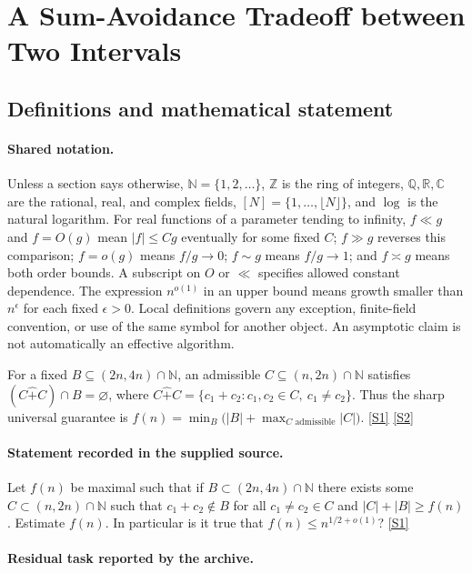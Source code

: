 \documentclass[11pt,a4paper]{article}
\newcommand{\N}{\mathbb{N}}
\newcommand{\Z}{\mathbb{Z}}
\newcommand{\Q}{\mathbb{Q}}
\newcommand{\R}{\mathbb{R}}
\newcommand{\C}{\mathbb{C}}
\newcommand{\sref}[2]{\hyperlink{source:#1:#2}{[S#2]}}
\begin{document}
\section{A Sum-Avoidance Tradeoff between Two Intervals}\label{statement}


\subsection{Definitions and mathematical statement}

\paragraph{Shared notation.}Unless a section says otherwise, $\N=\{1,2,\ldots\}$,
$\Z$ is the ring of integers, $\Q,\R,\C$ are the rational, real, and complex
fields, $[N]=\{1,\ldots,\lfloor N\rfloor\}$, and $\log$ is the natural
logarithm. For real functions of a parameter tending to infinity,
$f\ll g$ and $f=O(g)$ mean $|f|\leq Cg$ eventually for some fixed $C$;
$f\gg g$ reverses this comparison; $f=o(g)$ means $f/g\to0$;
$f\sim g$ means $f/g\to1$; and $f\asymp g$ means both order bounds.
A subscript on $O$ or $\ll$ specifies allowed constant dependence.
The expression $n^{o(1)}$ in an upper bound means growth smaller than
$n^\epsilon$ for each fixed $\epsilon>0$. Local definitions govern any
exception, finite-field convention, or use of the same symbol for another
object. An asymptotic claim is not automatically an effective algorithm.



For a fixed $B\subseteq(2n,4n)\cap\N$, an admissible $C\subseteq(n,2n)\cap\N$ satisfies $(C\mathbin{\hat+}C)\cap B=\varnothing$, where $C\mathbin{\hat+}C=\{c_1+c_2:c_1,c_2\in C,\ c_1\ne c_2\}$. Thus the sharp universal guarantee is $f(n)=\min_B\bigl(|B|+\max_{C\text{ admissible}}|C|\bigr)$. \sref{statement}{1} \sref{statement}{2}

\paragraph{Statement recorded in the supplied source.}
Let $f(n)$ be maximal such that if $B\subset (2n,4n)\cap \mathbb{N}$ there exists some $C\subset (n,2n)\cap \mathbb{N}$ such that $c_1+c_2\not\in B$ for all $c_1\neq c_2\in C$ and $\lvert C\rvert+\lvert B\rvert \geq f(n)$.
Estimate $f(n)$. In particular is it true that $f(n)\leq n^{1/2+o(1)}$? \sref{statement}{1}

\paragraph{Residual task reported by the archive.}
\end{document}
